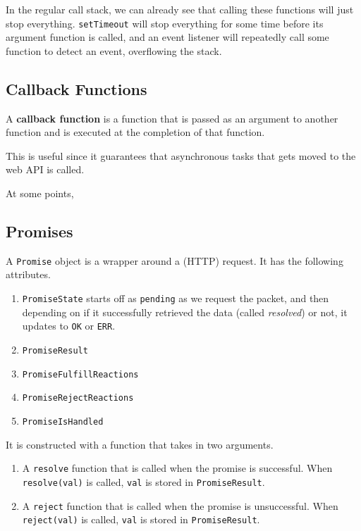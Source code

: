 \documentclass{article}
\newcounter{definition}[section]
\begin{document}
  In the regular call stack, we can already see that calling these functions will just stop everything. \texttt{setTimeout} will stop everything for some time before its argument function is called, and an event listener will repeatedly call some function to detect an event, overflowing the stack.  

  \subsection{Callback Functions}

    \begin{definition}
      \label{def:callback-function}
      A \textbf{callback function} is a function that is passed as an argument to another function and is executed at the completion of that function. 
    \end{definition}

    This is useful since it guarantees that asynchronous tasks that gets moved to the web API is called. 

    \begin{definition}
      \label{def:callback-hell}
      At some points,
    \end{definition}

  \subsection{Promises}

    \begin{definition}[Promise]
      \label{def:promise}
      A \texttt{Promise} object is a wrapper around a (HTTP) request. It has the following attributes. 
      \begin{enumerate}
        \item \texttt{PromiseState} starts off as \texttt{pending} as we request the packet, and then depending on if it successfully retrieved the data (called \textit{resolved}) or not, it updates to \texttt{OK} or \texttt{ERR}. 
        \item \texttt{PromiseResult} 
        \item \texttt{PromiseFulfillReactions}
        \item \texttt{PromiseRejectReactions}
        \item \texttt{PromiseIsHandled} 
      \end{enumerate}
      
      It is constructed with a function that takes in two arguments. 
      \begin{enumerate}
        \item A \texttt{resolve} function that is called when the promise is successful. When \texttt{resolve(val)} is called, \texttt{val} is stored in \texttt{PromiseResult}. 
        \item A \texttt{reject} function that is called when the promise is unsuccessful. When \texttt{reject(val)} is called, \texttt{val} is stored in \texttt{PromiseResult}.  
      \end{enumerate}
    \end{definition}
\end{document}
